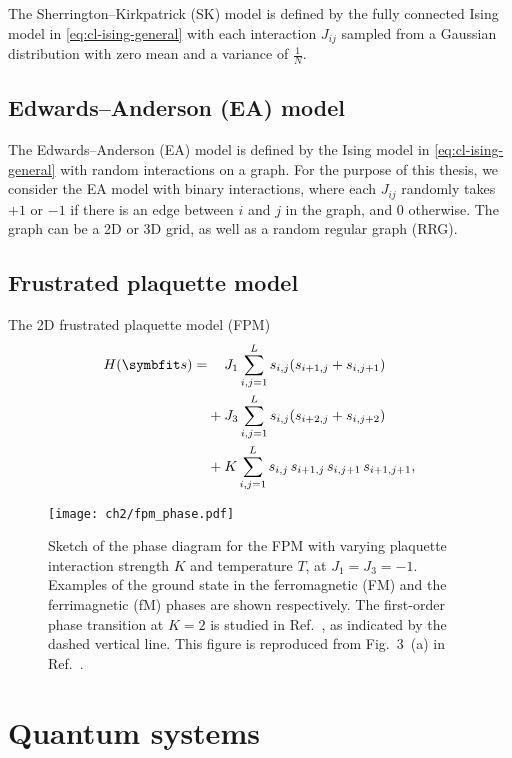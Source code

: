 The Sherrington--Kirkpatrick (SK) model is defined by the fully connected Ising model in \cref{eq:cl-ising-general} with each interaction $J_{i j}$ sampled from a Gaussian distribution with zero mean and a variance of $\frac{1}{N}$.

\subsection{Edwards--Anderson (EA) model}
\label{sec:ea}

The Edwards--Anderson (EA) model is defined by the Ising model in \cref{eq:cl-ising-general} with random interactions on a graph. For the purpose of this thesis, we consider the EA model with binary interactions, where each $J_{i j}$ randomly takes $+1$ or $-1$ if there is an edge between $i$ and $j$ in the graph, and $0$ otherwise. The graph can be a 2D or 3D grid, as well as a random regular graph (RRG).

\subsection{Frustrated plaquette model}
\label{sec:fpm}

The 2D frustrated plaquette model (FPM)
\begin{align}
H(\vs) = &\phantom{{}+{}} J_1 \sum_{i, j = 1}^L s_{i, j} (s_{i + 1, j} + s_{i, j + 1}) \nonumber \\
&+ J_3 \sum_{i, j = 1}^L s_{i, j} (s_{i + 2, j} + s_{i, j + 2}) \nonumber \\
&+ K \sum_{i, j = 1}^L s_{i, j} \, s_{i + 1, j} \, s_{i, j + 1} \, s_{i + 1, j + 1},
\label{eq:fpm}
\end{align}

\begin{figure}[htb]
\centering
\texttt{[image: ch2/fpm\_phase.pdf]}
\caption[Phase diagram of frustrated plaquette model (FPM)]{
Sketch of the phase diagram for the FPM with varying plaquette interaction strength $K$ and temperature $T$, at $J_1 = J_3 = -1$.
Examples of the ground state in the ferromagnetic (FM) and the ferrimagnetic (fM) phases are shown respectively.
The first-order phase transition at $K = 2$ is studied in Ref.~\cite{wu2021unbiased}, as indicated by the dashed vertical line.
This figure is reproduced from Fig.~3~(a) in Ref.~\cite{wu2021unbiased}.
}
\label{fig:fpm-phase}
\end{figure}

\section{Quantum systems}
\label{sec:qu-sys}

